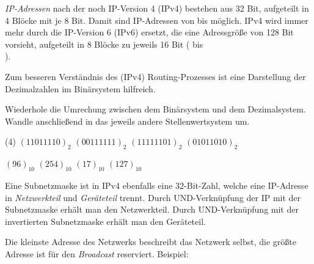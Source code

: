 \documentclass[10pt, a4paper]{arbeitsblatt}
\begin{document}
\ReiheTitel

\emph{IP-Adressen} nach der noch  IP-Version 4 (IPv4) bestehen aus 32 Bit, aufgeteilt in 4 Blöcke mit je 8 Bit. Damit sind IP-Adressen von  bis  möglich. IPv4 wird immer mehr durch die IP-Version 6 (IPv6) ersetzt, die eine Adressgröße von 128 Bit vorsieht, aufgeteilt in 8 Blöcke zu jeweils 16 Bit ( bis \\ ).

Zum besseren Verständnis des (IPv4) Routing-Prozesses ist eine Darstellung der Dezimalzahlen im Binärsystem hilfreich.

\begin{aufgabe}
	Wiederhole die Umrechung zwischen dem Binärsystem und dem Dezimalsystem. Wandle anschließend in das jeweils andere Stellenwertsystem um.

	\begin{tasks}(4)
		\task $(1101 1110)_2$
		\task $(0011 1111)_2$
		\task $(1111 1101)_2$
		\task $(0101 1010)_2$

		\task $(96)_{10}$
		\task $(254)_{10}$
		\task $(17)_{10}$
		\task $(127)_{10}$
	\end{tasks}
\end{aufgabe}

Eine Subnetzmaske ist in IPv4 ebenfalls eine 32-Bit-Zahl, welche eine IP-Adresse in \emph{Netzwerkteil} und \emph{Geräteteil} trennt. Durch UND-Verknüpfung der IP mit der Subnetzmaske erhält man den Netzwerkteil. Durch UND-Verknüpfung mit der invertierten Subnetzmaske erhält man den Geräteteil.

Die kleinste Adresse des Netzwerks beschreibt das Netzwerk selbst, die größte Adresse ist für den \emph{Broadcast} reserviert. Beispiel:
\end{document}
